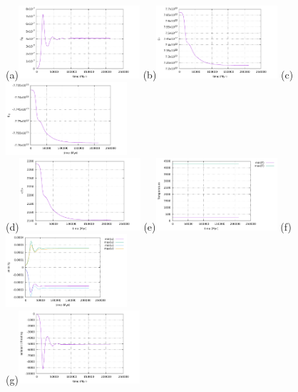 \begin{center}
(a)\includegraphics[width=4.5cm]{python_codes/fieldstone_compressible2/EBA_104/EK}
(b)\includegraphics[width=4.5cm]{python_codes/fieldstone_compressible2/EBA_104/ET}
(c)\includegraphics[width=4.5cm]{python_codes/fieldstone_compressible2/EBA_104/EG}\\
(d)\includegraphics[width=4.5cm]{python_codes/fieldstone_compressible2/EBA_104/Tavrg}
(e)\includegraphics[width=4.5cm]{python_codes/fieldstone_compressible2/EBA_104/T_stats}
(f)\includegraphics[width=4.5cm]{python_codes/fieldstone_compressible2/EBA_104/vel_stats}\\
(g)\includegraphics[width=4.5cm]{python_codes/fieldstone_compressible2/EBA_104/adiabatic_heating}

\end{center}

